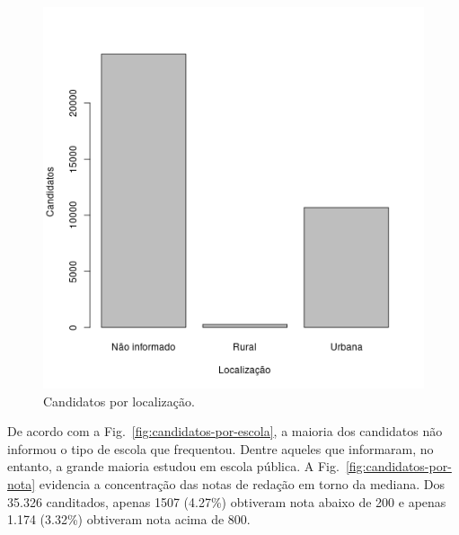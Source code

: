 \documentclass[12pt]{article}
\newcommand{\reffig}[1]{Fig.~\ref{fig:#1}}
\begin{document}
\begin{minipage}{.5\textwidth}
    \begin{figure}[H]
    \includegraphics[width=.9\linewidth]{../geral_candidatos-por-localizacao.png}
    \caption{Candidatos por localização.}
    \label{fig:candidatos-por-localizacao}
    \end{figure}
\end{minipage}


\vspace{1cm}
De acordo com a \reffig{candidatos-por-escola}, a maioria dos candidatos não informou o tipo de escola que frequentou.
Dentre aqueles que informaram, no entanto, a grande maioria estudou em escola pública.
A \reffig{candidatos-por-nota} evidencia a concentração das notas de redação em torno da mediana.
Dos 35.326 canditados, apenas 1507 (4.27\%) obtiveram nota abaixo de 200 e apenas 1.174 (3.32\%) obtiveram nota acima de 800.
\end{document}
